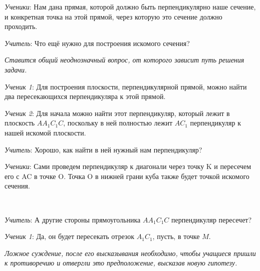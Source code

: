 \documentclass[a4paper,14pt,russian]{extreport}
\newcommand{\capt}[1]{%
    \\[8pt]
    \text{Рис. #1}
}
\begin{document}
\textit{Ученики}: Нам дана прямая, которой должно быть перпендикулярно наше сечение, и конкретная точка на этой прямой, через которую это сечение должно проходить. 

\textit{Учитель}: Что ещё нужно для построения искомого сечения?

\textit{Ставится общий неоднозначный вопрос, от которого зависит путь решения задачи.}

\textit{Ученик 1}: Для построения плоскости, перпендикулярной прямой, можно найти два пересекающихся перпендикуляра к этой прямой.

\textit{Ученик 2}: Для начала можно найти этот перпендикуляр, который лежит в плоскость $AA_1C_1C$, поскольку в ней полностью лежит $AC_1$ перпендикуляр к нашей искомой плоскости.

\textit{Учитель}: Хорошо, как найти в ней нужный нам перпендикуляр?

\textit{Ученики}: Сами проведем перпендикуляр к диагонали через точку K и пересечем его с AC в точке O. Точка O в нижней грани куба также будет точкой искомого сечения.

\begin{center}
\hspace{-3.9cm}
    \begin{minipage}{0.3\textwidth}
        \centering
    \end{minipage}
    \capt{2}
\end{center}

\textit{Учитель}: А другие стороны прямоугольника $AA_1C_1C$ перпендикуляр пересечет?

\textit{Ученик 1}: Да, он будет пересекать отрезок $A_1C_1$, пусть, в точке $M$. 

\textit{Ложное суждение, после его высказывания необходимо, чтобы учащиеся пришли к противоречию и отвергли это предположение, высказав новую гипотезу.}

\begin{center}
\hspace{-3.89cm}
    \begin{minipage}{0.3\textwidth}
        \centering
    \end{minipage}
    \capt{2}
\end{center}
\end{document}
